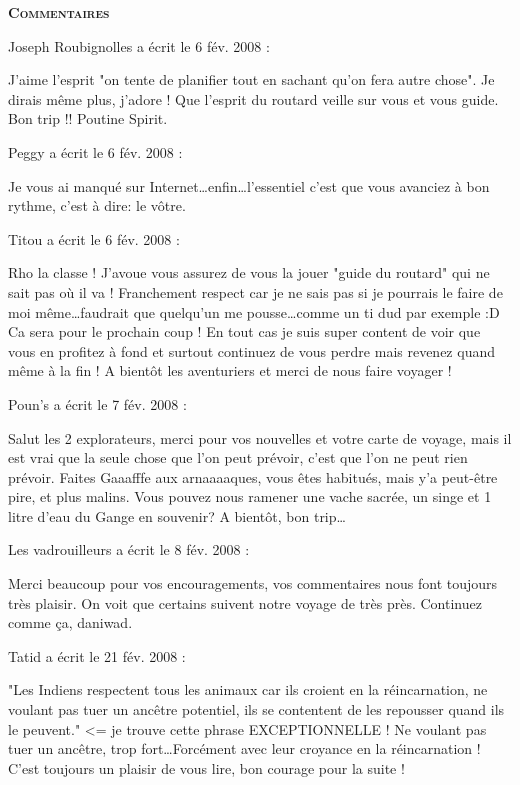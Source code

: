 \bigskip
\textbf{\textsc{Commentaires}}

\medskip
Joseph Roubignolles a écrit le 6 fév. 2008 :
\begin{displayquote}
J'aime l'esprit "on tente de planifier tout en sachant qu'on fera autre chose". Je dirais même plus, j'adore ! Que l'esprit du routard veille sur vous et vous guide.
Bon trip !!
Poutine Spirit.
\end{displayquote}

\medskip
Peggy a écrit le 6 fév. 2008 :
\begin{displayquote}
Je vous ai manqué sur Internet\dots enfin\dots l'essentiel c'est que vous avanciez à bon rythme, c'est à dire: le vôtre.
\end{displayquote}

\medskip
Titou a écrit le 6 fév. 2008 :
\begin{displayquote}
Rho la classe ! J'avoue vous assurez de vous la jouer "guide du routard" qui ne sait pas où il va ! Franchement respect car je ne sais pas si je pourrais le faire de moi même\dots faudrait que quelqu'un me pousse\dots comme un ti dud par exemple :D Ca sera pour le prochain coup ! En tout cas je suis super content de voir que vous en profitez à fond et surtout continuez de vous perdre mais revenez quand même à la fin ! A bientôt les aventuriers et merci de nous faire voyager !
\end{displayquote}

\medskip
Poun's a écrit le 7 fév. 2008 :
\begin{displayquote}
Salut  les 2 explorateurs, merci pour vos nouvelles et votre carte de voyage, mais il est vrai que la seule chose que l'on peut prévoir, c'est que l'on ne peut rien prévoir. Faites Gaaafffe aux arnaaaaques, vous êtes habitués, mais y'a peut-être pire, et plus malins.
Vous pouvez nous ramener une vache sacrée, un singe et 1 litre d'eau du Gange en souvenir?
A bientôt, bon trip\dots
\end{displayquote}

\medskip
Les vadrouilleurs a écrit le 8 fév. 2008 :
\begin{displayquote}
Merci beaucoup pour vos encouragements, vos commentaires nous font toujours très plaisir. On voit que certains suivent notre voyage de très près.
Continuez comme ça, daniwad.
\end{displayquote}

\medskip
Tatid a écrit le 21 fév. 2008 :
\begin{displayquote}
"Les Indiens respectent tous les animaux car ils croient en la réincarnation, ne voulant pas tuer un ancêtre potentiel, ils se contentent de les repousser quand ils le peuvent." <= je trouve cette phrase EXCEPTIONNELLE ! Ne voulant pas tuer un ancêtre, trop fort\dots Forcément avec leur croyance en la réincarnation !
C'est toujours un plaisir de vous lire, bon courage pour la suite !
\end{displayquote}

\vfill
